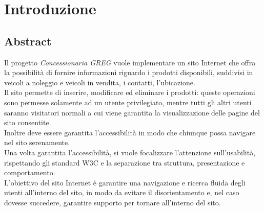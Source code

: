 \section{Introduzione}

\subsection{Abstract}
Il progetto \emph{Concessionaria GREG} vuole implementare un sito Internet che offra la possibilità di fornire informazioni riguardo i prodotti disponibili, suddivisi in veicoli a noleggio e veicoli in vendita, i contatti, l'ubicazione.\\
Il sito permette di inserire, modificare ed eliminare i prodotti: queste operazioni sono permesse solamente ad un utente privilegiato, mentre tutti gli altri utenti saranno visitatori normali a cui viene garantita la visualizzazione delle pagine del sito consentite.\\
Inoltre deve essere garantita l'accessibilità in modo che chiunque possa navigare nel sito serenamente.\\
Una volta garantita l'accessibilità, si vuole focalizzare l'attenzione sull'usabilità, rispettando gli standard W3C e la separazione tra struttura, presentazione e comportamento.\\
L'obiettivo del sito Internet è garantire una navigazione e ricerca fluida degli utenti all'interno del sito, in modo da evitare il disorientamento e, nel caso dovesse succedere, garantire supporto per tornare all'interno del sito.\\
\pagebreak